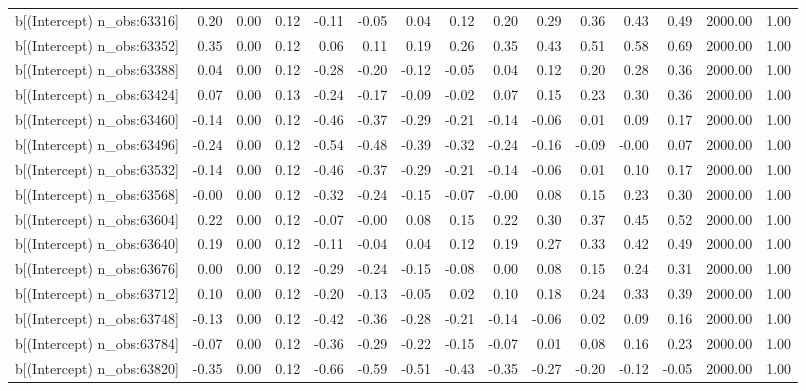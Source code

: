 \begin{table}[ht]
\begin{tabular}{rrrrrrrrrrrrrrr}
  b[(Intercept) n\_obs:63316] & 0.20 & 0.00 & 0.12 & -0.11 & -0.05 & 0.04 & 0.12 & 0.20 & 0.29 & 0.36 & 0.43 & 0.49 & 2000.00 & 1.00 \\ 
  b[(Intercept) n\_obs:63352] & 0.35 & 0.00 & 0.12 & 0.06 & 0.11 & 0.19 & 0.26 & 0.35 & 0.43 & 0.51 & 0.58 & 0.69 & 2000.00 & 1.00 \\ 
  b[(Intercept) n\_obs:63388] & 0.04 & 0.00 & 0.12 & -0.28 & -0.20 & -0.12 & -0.05 & 0.04 & 0.12 & 0.20 & 0.28 & 0.36 & 2000.00 & 1.00 \\ 
  b[(Intercept) n\_obs:63424] & 0.07 & 0.00 & 0.13 & -0.24 & -0.17 & -0.09 & -0.02 & 0.07 & 0.15 & 0.23 & 0.30 & 0.36 & 2000.00 & 1.00 \\ 
  b[(Intercept) n\_obs:63460] & -0.14 & 0.00 & 0.12 & -0.46 & -0.37 & -0.29 & -0.21 & -0.14 & -0.06 & 0.01 & 0.09 & 0.17 & 2000.00 & 1.00 \\ 
  b[(Intercept) n\_obs:63496] & -0.24 & 0.00 & 0.12 & -0.54 & -0.48 & -0.39 & -0.32 & -0.24 & -0.16 & -0.09 & -0.00 & 0.07 & 2000.00 & 1.00 \\ 
  b[(Intercept) n\_obs:63532] & -0.14 & 0.00 & 0.12 & -0.46 & -0.37 & -0.29 & -0.21 & -0.14 & -0.06 & 0.01 & 0.10 & 0.17 & 2000.00 & 1.00 \\ 
  b[(Intercept) n\_obs:63568] & -0.00 & 0.00 & 0.12 & -0.32 & -0.24 & -0.15 & -0.07 & -0.00 & 0.08 & 0.15 & 0.23 & 0.30 & 2000.00 & 1.00 \\ 
  b[(Intercept) n\_obs:63604] & 0.22 & 0.00 & 0.12 & -0.07 & -0.00 & 0.08 & 0.15 & 0.22 & 0.30 & 0.37 & 0.45 & 0.52 & 2000.00 & 1.00 \\ 
  b[(Intercept) n\_obs:63640] & 0.19 & 0.00 & 0.12 & -0.11 & -0.04 & 0.04 & 0.12 & 0.19 & 0.27 & 0.33 & 0.42 & 0.49 & 2000.00 & 1.00 \\ 
  b[(Intercept) n\_obs:63676] & 0.00 & 0.00 & 0.12 & -0.29 & -0.24 & -0.15 & -0.08 & 0.00 & 0.08 & 0.15 & 0.24 & 0.31 & 2000.00 & 1.00 \\ 
  b[(Intercept) n\_obs:63712] & 0.10 & 0.00 & 0.12 & -0.20 & -0.13 & -0.05 & 0.02 & 0.10 & 0.18 & 0.24 & 0.33 & 0.39 & 2000.00 & 1.00 \\ 
  b[(Intercept) n\_obs:63748] & -0.13 & 0.00 & 0.12 & -0.42 & -0.36 & -0.28 & -0.21 & -0.14 & -0.06 & 0.02 & 0.09 & 0.16 & 2000.00 & 1.00 \\ 
  b[(Intercept) n\_obs:63784] & -0.07 & 0.00 & 0.12 & -0.36 & -0.29 & -0.22 & -0.15 & -0.07 & 0.01 & 0.08 & 0.16 & 0.23 & 2000.00 & 1.00 \\ 
  b[(Intercept) n\_obs:63820] & -0.35 & 0.00 & 0.12 & -0.66 & -0.59 & -0.51 & -0.43 & -0.35 & -0.27 & -0.20 & -0.12 & -0.05 & 2000.00 & 1.00 \\ 

\end{tabular}
\end{table}
